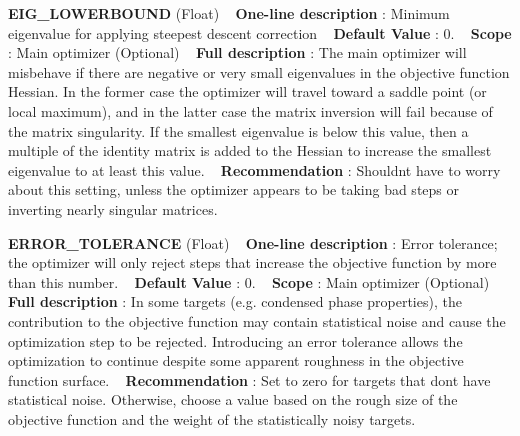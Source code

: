 \begin{DoxyItemize}
\item {\bfseries  E\+I\+G\+\_\+\+L\+O\+W\+E\+R\+B\+O\+U\+ND } (Float) ~\newline
{\bfseries  One-\/line description }\+: Minimum eigenvalue for applying steepest descent correction ~\newline
{\bfseries  Default Value }\+: 0. ~\newline
{\bfseries  Scope }\+: Main optimizer (Optional) ~\newline
{\bfseries  Full description }\+: The main optimizer will misbehave if there are negative or very small eigenvalues in the objective function Hessian. In the former case the optimizer will travel toward a saddle point (or local maximum), and in the latter case the matrix inversion will fail because of the matrix singularity. If the smallest eigenvalue is below this value, then a multiple of the identity matrix is added to the Hessian to increase the smallest eigenvalue to at least this value. ~\newline
{\bfseries  Recommendation }\+: Shouldn\textquotesingle{}t have to worry about this setting, unless the optimizer appears to be taking bad steps or inverting nearly singular matrices.\end{DoxyItemize}
\begin{DoxyItemize}
\item {\bfseries  E\+R\+R\+O\+R\+\_\+\+T\+O\+L\+E\+R\+A\+N\+CE } (Float) ~\newline
{\bfseries  One-\/line description }\+: Error tolerance; the optimizer will only reject steps that increase the objective function by more than this number. ~\newline
{\bfseries  Default Value }\+: 0. ~\newline
{\bfseries  Scope }\+: Main optimizer (Optional) ~\newline
{\bfseries  Full description }\+: In some targets (e.\+g. condensed phase properties), the contribution to the objective function may contain statistical noise and cause the optimization step to be rejected. Introducing an error tolerance allows the optimization to continue despite some apparent roughness in the objective function surface. ~\newline
{\bfseries  Recommendation }\+: Set to zero for targets that don\textquotesingle{}t have statistical noise. Otherwise, choose a value based on the rough size of the objective function and the weight of the statistically noisy targets.\end{DoxyItemize}

